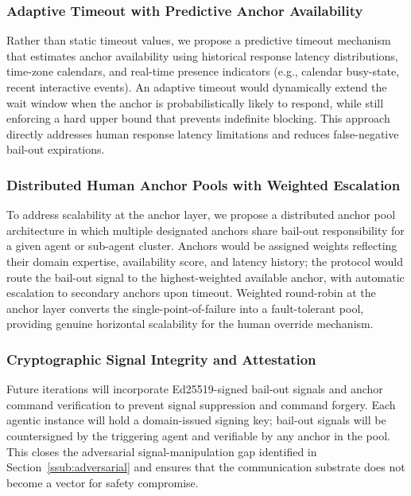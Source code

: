 \subsubsection{Adaptive Timeout with Predictive Anchor Availability}\label{ssub:adaptive_timeout}
Rather than static timeout values, we propose a predictive timeout mechanism that estimates anchor availability using historical response latency distributions, time-zone calendars, and real-time presence indicators (e.g., calendar busy-state, recent interactive events). An adaptive timeout would dynamically extend the wait window when the anchor is probabilistically likely to respond, while still enforcing a hard upper bound that prevents indefinite blocking. This approach directly addresses human response latency limitations and reduces false-negative bail-out expirations.

\subsubsection{Distributed Human Anchor Pools with Weighted Escalation}\label{ssub:distributed_anchors}
To address scalability at the anchor layer, we propose a distributed anchor pool architecture in which multiple designated anchors share bail-out responsibility for a given agent or sub-agent cluster. Anchors would be assigned weights reflecting their domain expertise, availability score, and latency history; the protocol would route the bail-out signal to the highest-weighted available anchor, with automatic escalation to secondary anchors upon timeout. Weighted round-robin at the anchor layer converts the single-point-of-failure into a fault-tolerant pool, providing genuine horizontal scalability for the human override mechanism.

\subsubsection{Cryptographic Signal Integrity and Attestation}\label{ssub:crypto_attestation}
Future iterations will incorporate Ed25519-signed bail-out signals and anchor command verification to prevent signal suppression and command forgery. Each agentic instance will hold a domain-issued signing key; bail-out signals will be countersigned by the triggering agent and verifiable by any anchor in the pool. This closes the adversarial signal-manipulation gap identified in Section~\ref{ssub:adversarial} and ensures that the communication substrate does not become a vector for safety compromise.

